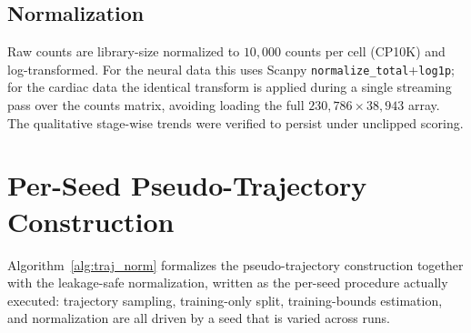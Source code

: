 \documentclass[10pt,journal,compsoc]{IEEEtran}
\begin{document}
\subsection{Normalization}
Raw counts are library-size normalized to $10{,}000$ counts per cell (CP10K) and log-transformed. For the neural data this uses Scanpy \texttt{normalize\_total}+\texttt{log1p}; for the cardiac data the identical transform is applied during a single streaming pass over the counts matrix, avoiding loading the full $230{,}786\times 38{,}943$ array. The qualitative stage-wise trends were verified to persist under unclipped scoring.

\section{Per-Seed Pseudo-Trajectory Construction}
\label{sup:alg}

Algorithm~\ref{alg:traj_norm} formalizes the pseudo-trajectory construction together with the leakage-safe normalization, written as the per-seed procedure actually executed: trajectory sampling, training-only split, training-bounds estimation, and normalization are all driven by a seed that is varied across runs.
\end{document}
